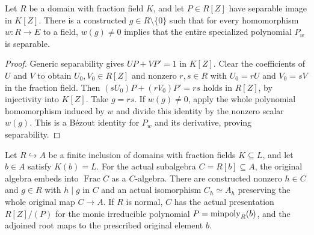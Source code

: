 \begin{lemma}\label{lem:fc-separable-good-locus}
\leanok
{}
Let $R$ be a domain with fraction field $K$, and let $P\in R[Z]$ have separable image in $K[Z]$.
There is a constructed $g\in R\setminus\{0\}$ such that for every homomorphism $w\colon R\to E$ to a field,
$w(g)\ne0$ implies that the entire specialized polynomial $P_w$ is separable.
\end{lemma}

\begin{proof}
Generic separability gives $UP+VP'=1$ in $K[Z]$. Clear the coefficients of $U$ and $V$ to obtain
$U_0,V_0\in R[Z]$ and nonzero $r,s\in R$ with $U_0=rU$ and $V_0=sV$ in the fraction field.
Then $(sU_0)P+(rV_0)P'=rs$ holds in $R[Z]$, by injectivity into $K[Z]$.
Take $g=rs$. If $w(g)\ne0$, apply the whole polynomial homomorphism induced by $w$ and divide this identity
by the nonzero scalar $w(g)$. This is a B\'ezout identity for $P_w$ and its derivative, proving separability.
\end{proof}

\begin{lemma}\label{lem:fc-primitive-monogenic-subalgebra}
\leanok
{}
Let $R\hookrightarrow A$ be a finite inclusion of domains with fraction fields $K\subseteq L$, and let
$b\in A$ satisfy $K(b)=L$. For the actual subalgebra $C=R[b]\subseteq A$, the original algebra embeds into
$\operatorname{Frac} C$ as a $C$-algebra. There are constructed nonzero $h\in C$ and $g\in R$ with $h\mid g$
in $C$ and an actual isomorphism $C_h\simeq A_h$ preserving the whole original map $C\to A$.
If $R$ is normal, $C$ has the actual presentation $R[Z]/(P)$ for the monic irreducible polynomial
$P=\operatorname{minpoly}_R(b)$, and the adjoined root maps to the prescribed original element $b$.
\end{lemma}

